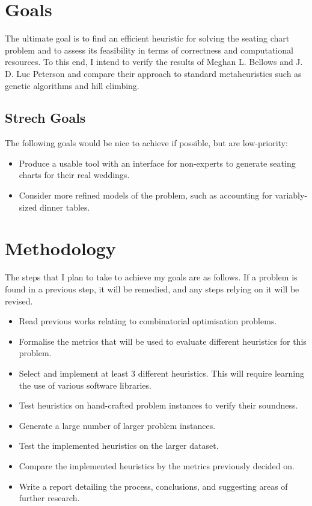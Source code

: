 \documentclass[a4paper,12pt]{article}
\begin{document}
\section*{Goals}

The ultimate goal is to find an efficient heuristic for solving the seating
chart problem and to assess its feasibility in terms of correctness and
computational resources. To this end, I intend to verify the results of Meghan
L. Bellows and J. D. Luc Peterson \cite{bellows-peterson} and compare their approach to
standard metaheuristics such as genetic algorithms and hill climbing.

\subsection*{Strech Goals}

The following goals would be nice to achieve if possible, but are low-priority:

\begin{itemize}
\item Produce a usable tool with an interface for non-experts to generate
      seating charts for their real weddings.
\item Consider more refined models of the problem, such as accounting for
      variably-sized dinner tables.
\end{itemize}

\section*{Methodology}

The steps that I plan to take to achieve my goals are as follows. If a problem
is found in a previous step, it will be remedied, and any steps relying on it
will be revised.

\begin{itemize}
\item Read previous works relating to combinatorial optimisation problems.
\item Formalise the metrics that will be used to evaluate different heuristics for
      this problem.
\item Select and implement at least 3 different heuristics. This will require
      learning the use of various software libraries.
\item Test heuristics on hand-crafted problem instances to verify their soundness.
\item Generate a large number of larger problem instances.
\item Test the implemented heuristics on the larger dataset.
\item Compare the implemented heuristics by the metrics previously decided on.
\item Write a report detailing the process, conclusions, and suggesting areas of
      further research.
\end{itemize}
\end{document}
